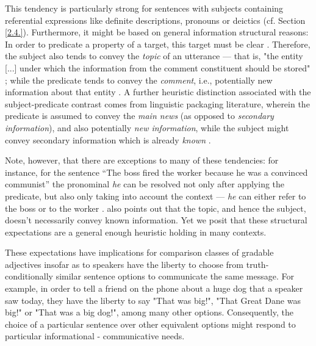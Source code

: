 This tendency is particularly strong for sentences with subjects containing referential expressions like definite descriptions, pronouns or deictics (cf. Section \ref{2.4.}). Furthermore, it might be based on general information structural reasons: In order to predicate a property of a target, this target must be clear \parencite{searle1969speech, krifka2008basic}. Therefore, the subject also tends to convey the \textit{topic} of an utterance --- that is, "the entity [...] under which the information from the comment constituent should be stored" \parencite[p. 265]{krifka2008basic}; while the predicate tends to convey the \textit{comment},  i.e., potentially new information about that entity \parencite{krifka2008basic, chafe1976givenness, Reboul2001}. A further heuristic distinction associated with the subject-predicate contrast comes from linguistic packaging literature, wherein the predicate is assumed to convey the \textit{main news} (as opposed to \textit{secondary information}), and also potentially \textit{new information}, while the subject might convey secondary information which is already \textit{known} \parencite{kaiser2020}. 

Note, however, that there are exceptions to many of these tendencies: for instance, for the sentence “The boss fired the worker because he was a convinced communist” the pronominal \emph{he} can be resolved not only after applying the predicate, but also only taking into account the context --- \emph{he} can either refer to the boss or to the worker \parencite{Reboul2001}. \textcite{krifka2008basic} also points out that the topic, and hence the subject,  doesn't necessarily convey known information.
Yet we posit that these structural expectations are a general enough heuristic holding in many contexts.

These expectations have implications for comparison classes of gradable adjectives insofar as to speakers have the liberty to choose from truth-conditionally similar sentence options to communicate the same message. For example, in order to tell a friend on the phone about a huge dog that a speaker saw today, they have the liberty to say "That was big!", "That Great Dane was big!" or "That was a big dog!", among many other options. Consequently, the choice of a particular sentence over other equivalent options might respond to particular informational - communicative needs. 

